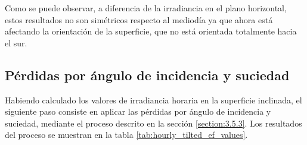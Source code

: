 Como se  puede observar, a diferencia de la irradiancia en el plano horizontal, estos resultados no son simétricos respecto al mediodía ya que ahora está afectando la orientación de la superficie, que no está orientada totalmente hacia el sur.

\subsection{Pérdidas por ángulo de incidencia y suciedad}

Habiendo calculado los valores de irradiancia horaria en la superficie inclinada, el siguiente paso consiste en aplicar las pérdidas por ángulo de incidencia y suciedad, mediante el proceso descrito en la sección \ref{section:3.5.3}. Los resultados del proceso se muestran en la tabla \ref{tab:hourly_tilted_ef_values}.

